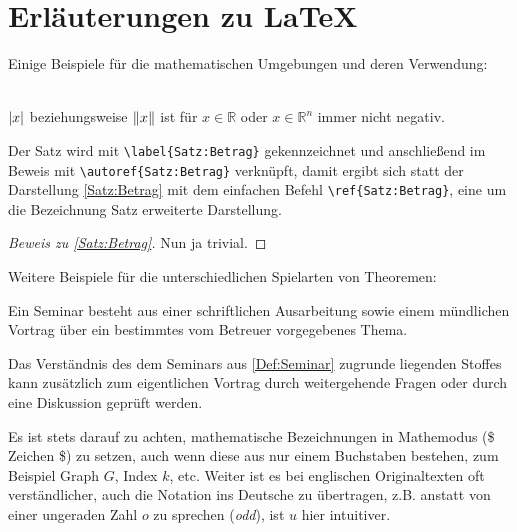 \section{Erläuterungen zu \LaTeX} 

Einige Beispiele für die mathematischen Umgebungen und deren Verwendung:

\begin{satz}\label{Satz:Betrag}\hspace{0em}\\
 $ \lvert x \rvert $ beziehungsweise $ \lVert x \rVert $ ist für $ x\in \mathbb{R} $ oder $ x \in \mathbb{R}^{n} $ immer nicht negativ.
\end{satz}

Der Satz wird mit \verb+\label{Satz:Betrag}+ gekennzeichnet und anschließend im Beweis mit \verb+\autoref{Satz:Betrag}+ verknüpft, damit ergibt sich statt der Darstellung \ref{Satz:Betrag} mit dem einfachen Befehl \verb+\ref{Satz:Betrag}+, eine um die Bezeichnung Satz erweiterte Darstellung.

\begin{proof}[Beweis zu \autoref{Satz:Betrag}]
 Nun ja trivial.
\end{proof}

Weitere Beispiele für die unterschiedlichen Spielarten von Theoremen:

\begin{definition}[Seminar]\label{Def:Seminar}
 Ein Seminar besteht aus einer schriftlichen Ausarbeitung sowie einem mündlichen Vortrag über ein bestimmtes vom Betreuer vorgegebenes Thema.
\end{definition}

\begin{bemerkung}
Das Verständnis des dem Seminars aus \autoref{Def:Seminar} zugrunde liegenden Stoffes kann zusätzlich zum eigentlichen Vortrag durch weitergehende Fragen oder durch eine Diskussion geprüft werden.
\end{bemerkung}

\begin{notation} 
Es ist stets darauf zu achten, mathematische Bezeichnungen in Mathemodus (\$ Zeichen \$) zu setzen, auch wenn diese aus nur einem Buchstaben bestehen, zum Beispiel Graph $G$, Index $k$, etc. Weiter ist es bei englischen Originaltexten oft verständlicher, auch die Notation ins Deutsche zu übertragen, z.B. anstatt von einer ungeraden Zahl $o$ zu sprechen (\textit{odd}), ist $u$ hier intuitiver.
\end{notation} 


